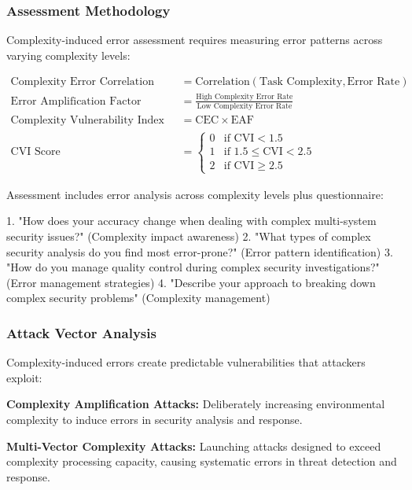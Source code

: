 \documentclass[11pt,a4paper]{article}
\begin{document}
\subsubsection{Assessment Methodology}

Complexity-induced error assessment requires measuring error patterns across varying complexity levels:

\begin{align}
\text{Complexity Error Correlation (CEC)} &= \text{Correlation}(\text{Task Complexity}, \text{Error Rate}) \\
\text{Error Amplification Factor (EAF)} &= \frac{\text{High Complexity Error Rate}}{\text{Low Complexity Error Rate}} \\
\text{Complexity Vulnerability Index (CVI)} &= \text{CEC} \times \text{EAF} \\
\text{CVI Score} &= \begin{cases}
0 & \text{if CVI} < 1.5 \\
1 & \text{if } 1.5 \leq \text{CVI} < 2.5 \\
2 & \text{if CVI} \geq 2.5
\end{cases}
\end{align}

Assessment includes error analysis across complexity levels plus questionnaire:

1. "How does your accuracy change when dealing with complex multi-system security issues?" (Complexity impact awareness)
2. "What types of complex security analysis do you find most error-prone?" (Error pattern identification)
3. "How do you manage quality control during complex security investigations?" (Error management strategies)
4. "Describe your approach to breaking down complex security problems" (Complexity management)

\subsubsection{Attack Vector Analysis}

Complexity-induced errors create predictable vulnerabilities that attackers exploit:

\textbf{Complexity Amplification Attacks:} Deliberately increasing environmental complexity to induce errors in security analysis and response.

\textbf{Multi-Vector Complexity Attacks:} Launching attacks designed to exceed complexity processing capacity, causing systematic errors in threat detection and response.
\end{document}
